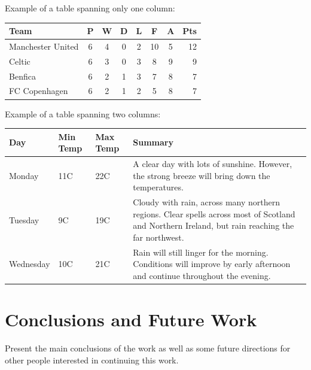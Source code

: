 \documentclass[10pt,twocolumn,letterpaper]{article}
\begin{document}
Example of a table spanning only one column: 

\begin{table}
\begin{center}
\begin{tabular}{l*{6}{c}r}
Team              & P & W & D & L & F  & A & Pts \\
\hline
Manchester United & 6 & 4 & 0 & 2 & 10 & 5 & 12  \\
Celtic            & 6 & 3 & 0 & 3 &  8 & 9 &  9  \\
Benfica           & 6 & 2 & 1 & 3 &  7 & 8 &  7  \\
FC Copenhagen     & 6 & 2 & 1 & 2 &  5 & 8 &  7  \\
\end{tabular}
\end{center}
\end{table}

Example of a table spanning two columns: 

\begin{table}
\begin{center}
    \begin{tabular}{ | l | l | l | p{8cm} |}
    \hline
    Day & Min Temp & Max Temp & Summary \\ \hline
    Monday & 11C & 22C & A clear day with lots of sunshine.  
    However, the strong breeze will bring down the temperatures. \\ \hline
    Tuesday & 9C & 19C & Cloudy with rain, across many northern regions. Clear spells
    across most of Scotland and Northern Ireland,
    but rain reaching the far northwest. \\ \hline
    Wednesday & 10C & 21C & Rain will still linger for the morning.
    Conditions will improve by early afternoon and continue
    throughout the evening. \\
    \hline
    \end{tabular}
\end{center}    
\end{table}

\section{Conclusions and Future Work}
Present the main conclusions of the work as well as some future directions for other people interested in continuing this work. 

{\small


}
\end{document}

